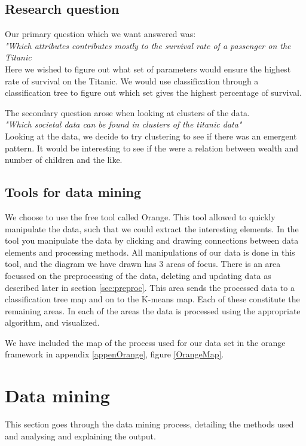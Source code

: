 \documentclass[a4paper,11pt]{article}
\begin{document}
\subsection{Research question}
Our primary question which we want answered was:\\
\textit{"Which attributes contributes mostly to the survival rate of a passenger on the Titanic}\\
Here we wished to figure out what set of parameters would ensure the highest rate of survival on the Titanic. We would use classification through a classification tree to figure out which set gives the highest percentage of survival.

The secondary question arose when looking at clusters of the data.\\
\textit{"Which societal data can be found in clusters of the titanic data"}\\
Looking at the data, we decide to try clustering to see if there was an emergent pattern. It would be interesting to see if the were a relation between wealth and number of children and the like. 
\subsection{Tools for data mining}
We choose to use the free tool called Orange\cite{orange}. This tool allowed to quickly manipulate the data, such that we could extract the interesting elements. 
In the tool you manipulate the data by clicking and drawing connections between data elements and processing methods. All manipulations of our data is done in this tool, and the diagram we have drawn has 3 areas of focus. There is an area focussed on the preprocessing of the data, deleting and updating data as described later in section \ref{sec:preproc}. This area sends the processed data to a classification tree map and on to the K-means map. Each of these constitute the remaining areas. In each of the areas the data is processed using the appropriate algorithm, and visualized.

We have included the map of the process used for our data set in the orange framework in appendix \ref{appenOrange}, figure \ref{OrangeMap}.

\clearpage
\section{Data mining}
This section goes through the data mining process, detailing the methods used and analysing and explaining the output. 
\end{document}
